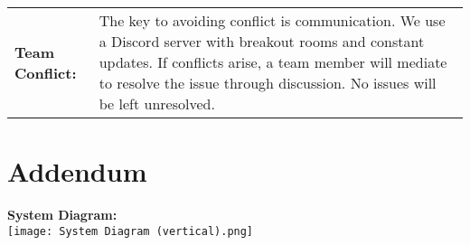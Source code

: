\documentclass[a4paper,12pt]{article}
\begin{document}
\begin{center}
    \begin{tabular}{|p{}|p{}|}
        \hline
        \textbf{Team Conflict:} & \parbox{0.65\textwidth}{\vspace{0.3cm} The key to avoiding conflict is communication. We use a Discord server with breakout rooms and constant updates. If conflicts arise, a team member will mediate to resolve the issue through discussion. No issues will be left unresolved.
        \vspace{0.3cm}} \\ 
        \hline
    \end{tabular}
\end{center}

\newpage
\section*{Addendum}

\begin{center}
    \vspace{5cm} %
    \textbf{System Diagram:} \\
    \vspace{0.5cm}
    \texttt{[image: System Diagram (vertical).png]}
\end{center}

\vfill %
\end{document}
